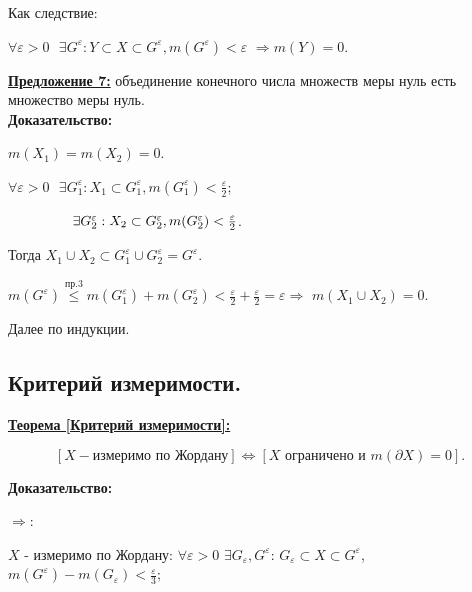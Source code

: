 \documentclass[a4paper,12pt]{article} %
\begin{document}
Как следствие:

$\forall \varepsilon > 0 \text{ }\exists G^{\varepsilon}: Y\subset X \subset G^{\varepsilon}, m(G^{\varepsilon}) < \varepsilon$ $\Rightarrow m(Y) = 0$.

\vspace{3mm}

\underline{\textbf{Предложение 7:}} объединение конечного числа множеств меры нуль есть множество меры нуль.\\

\textbf{Доказательство:}

$m(X_1) = m(X_2) = 0$.

$\forall \varepsilon > 0 \text{ }\exists G_1^{\varepsilon}: X_1 \subset G_1^{\varepsilon}, m(G_1^{\varepsilon}) < \frac{\varepsilon}{2}$;

$\hspace{16mm}\exists G_2^{\varepsilon}: X_2 \subset G_2^{\varepsilon}, m(G_2^{\varepsilon}) < \frac{\varepsilon}{2}$.

Тогда $X_1 \cup X_2 \subset G_1^{\varepsilon} \cup G_2^{\varepsilon} = G^{\varepsilon}$.

$m(G^{\varepsilon}) \stackrel{\text{пр.3}}{\leqslant} m(G_1^{\varepsilon}) + m(G_2^{\varepsilon}) < \frac{\varepsilon}{2} + \frac{\varepsilon}{2} = \varepsilon \Rightarrow$ $m(X_1 \cup X_2) = 0$.

Далее по индукции.\\

\subsection{Критерий измеримости.}

\underline{\textbf{Теорема [Критерий измеримости]:}}

\begin{equation*}
	\left[X - \text{измеримо по Жордану}\right] \Longleftrightarrow \left[ X \text{ ограничено и } m(\partial X) = 0\right].
\end{equation*}	

\textbf{Доказательство:}

$\Longrightarrow$:

$X$ - измеримо по Жордану: $\forall \varepsilon > 0$ $\exists G_{\varepsilon}, G^{\varepsilon}$: $G_{\varepsilon} \subset X \subset G^{\varepsilon}$, \\$m(G^{\varepsilon}) - m(G_{\varepsilon}) < \frac{\varepsilon}{3}$;

\vspace{2mm}
\end{document}
